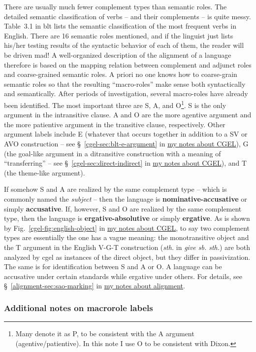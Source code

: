 \documentclass[UTF8, a4paper, oneside, scheme=plain]{ctexart}
\newcommand*{\citesec}[1]{\S~{#1}}
\newcommand*{\citefig}[1]{Fig.~{#1}}
\newcommand*{\citetable}[1]{Table~{#1}}
\newcommand*{\concept}[1]{\textbf{#1}}
\newcommand*{\term}[1]{\emph{#1}}
\newcommand*{\corpus}[1]{\emph{#1}}
\newcommand{\cgel}{\href{../English/cambridge.pdf}{my notes about CGEL}}
\newcommand{\alignment}{\href{../alignment/alignment.pdf}{my notes about alignment}}
\begin{document}
There are usually much fewer complement types than semantic roles.
The detailed semantic classification of verbs -- and their complements -- is quite messy. 
\citetable{3.1} in \ac{blt} lists the semantic classification of the most frequent verbs in English.
There are 16 semantic roles mentioned, 
and if the linguist just lists his/her testing results of the syntactic behavior of each of them,
the reader will be driven mad!
A well-organized description of the alignment of a language therefore is based on 
the mapping relation between complement and adjunct roles and coarse-grained semantic roles.
A priori no one knows how to coarse-grain semantic roles 
so that the resulting ``macro-roles'' make sense both syntactically and semantically.
After periods of investigation, several macro-roles have already been identified.
The most important three are S, A, and O\footnote{
    Many denote it as P, to be consistent with the A argument (agentive/patientive). 
    In this note I use O to be consistent with Dixon.
}.
S is the only argument in the intransitive clause.
A and O are the more agentive argument and the more patientive argument in the transitive clause, 
respectively.
Other argument labels include E 
(whatever that occurs together in addition to a SV or AVO construction
-- see \citesec{\ref{cgel-sec:blt-e-argument}} in \cgel),
G (the goal-like argument in a ditransitive construction with a meaning of ``transferring''
-- see \citesec{\ref{cgel-sec:direct-indirect}} in \cgel),
and T (the theme-like argument).

If somehow S and A are realized by the same complement type 
-- which is commonly named the \term{subject} --
then the language is \concept{nominative-accusative} or simply \concept{accusative}.
If, however, S and O are realized by the same complement type,
then the language is \concept{ergative-absolutive} or simply \concept{ergative}.
As is shown by \citefig{\ref{cgel-fig:english-object}} in \cgel,
to say two complement types are essentially the one 
has a vague meaning:
the monotransitive object and the T argument in the English V-G-T construction 
(\term{sth.} in \corpus{give sb. sth.})
are both analyzed by \ac{cgel} as instances of the direct object,
but they differ in passivization.
The same is for identification between S and A or O.
A language can be accusative under certain standards while ergative under others.
For details, see \citesec{\ref{alignment-sec:sao-marking}} in \alignment.

\subsubsection{Additional notes on macrorole labels}
\end{document}
